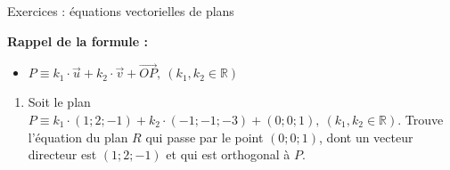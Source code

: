 



	\vspace{3em}
	\begin{center}
			{\Large Exercices : équations vectorielles de plans}
	\end{center}
	
	\vspace{3em}
	
	\textbf{Rappel de la formule :}
	\begin{itemize}
		\item $P \equiv k_1 \cdot \vec{u} + k_2 \cdot \vec{v} + \vec{OP},~ (k_1, k_2 \in \mathbb{R})$
	\end{itemize}

	
	\begin{enumerate}
		\item Soit le plan $P \equiv k_1 \cdot \left(1; 2; -1\right) + k_2 \cdot \left(-1; -1; -3\right) + \left(0; 0; 1\right), ~ (k_1, k_2 \in \mathbb{R})$. Trouve l'équation du plan $R$ qui passe par le point $\left(0; 0; 1\right)$, dont un vecteur directeur est $\left(1; 2; -1\right)$ et qui est orthogonal à $P$.
			
	\end{enumerate}
	
